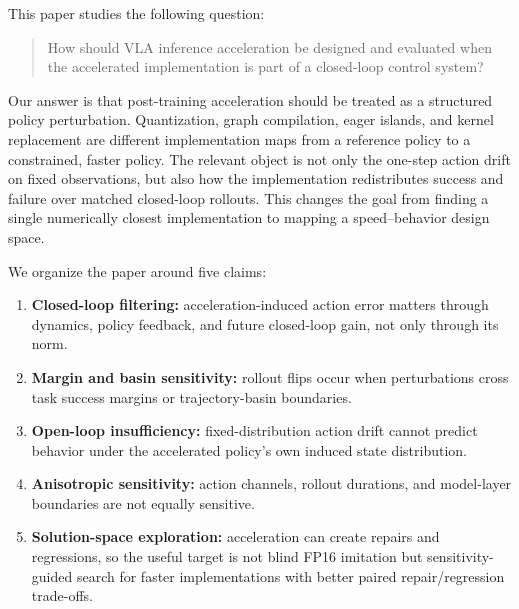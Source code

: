 \documentclass[10pt]{article}
\begin{document}
This paper studies the following question:
\begin{quote}
How should VLA inference acceleration be designed and evaluated when the accelerated implementation is part of a closed-loop control system?
\end{quote}

Our answer is that post-training acceleration should be treated as a structured policy perturbation. Quantization, graph compilation, eager islands, and kernel replacement are different implementation maps from a reference policy to a constrained, faster policy. The relevant object is not only the one-step action drift on fixed observations, but also how the implementation redistributes success and failure over matched closed-loop rollouts. This changes the goal from finding a single numerically closest implementation to mapping a speed--behavior design space.

We organize the paper around five claims:
\begin{enumerate}
    \item \textbf{Closed-loop filtering:} acceleration-induced action error matters through dynamics, policy feedback, and future closed-loop gain, not only through its norm.
    \item \textbf{Margin and basin sensitivity:} rollout flips occur when perturbations cross task success margins or trajectory-basin boundaries.
    \item \textbf{Open-loop insufficiency:} fixed-distribution action drift cannot predict behavior under the accelerated policy's own induced state distribution.
    \item \textbf{Anisotropic sensitivity:} action channels, rollout durations, and model-layer boundaries are not equally sensitive.
    \item \textbf{Solution-space exploration:} acceleration can create repairs and regressions, so the useful target is not blind FP16 imitation but sensitivity-guided search for faster implementations with better paired repair/regression trade-offs.
\end{enumerate}
\end{document}
